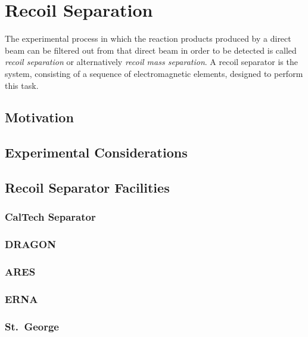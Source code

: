 
\section{Recoil Separation}

The experimental process in which the reaction products produced by a direct
beam can be filtered out from that direct beam in order to be detected is
called \emph{recoil separation} or alternatively \emph{recoil mass separation}.
A recoil separator is the system, consisting of a sequence of electromagnetic
elements, designed to perform this task.

\subsection{Motivation}
\subsection{Experimental Considerations}
\subsection{Recoil Separator Facilities}
\subsubsection{CalTech Separator}
\subsubsection{DRAGON}
\subsubsection{ARES}
\subsubsection{ERNA}
\subsubsection{St.\ George}

